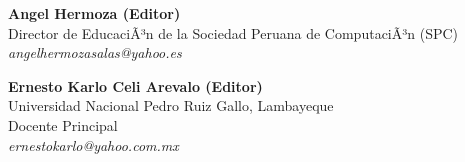 \begin{center}
\textbf{Angel Hermoza (Editor)}\\
Director de EducaciÃ³n de la Sociedad Peruana de ComputaciÃ³n (SPC)\\
\textit{angelhermozasalas@yahoo.es}
\end{center}

\begin{center}
\textbf{Ernesto Karlo Celi Arevalo (Editor)}\\
Universidad Nacional Pedro Ruiz Gallo, Lambayeque\\
Docente Principal\\
\textit{ernestokarlo@yahoo.com.mx}
\end{center}

